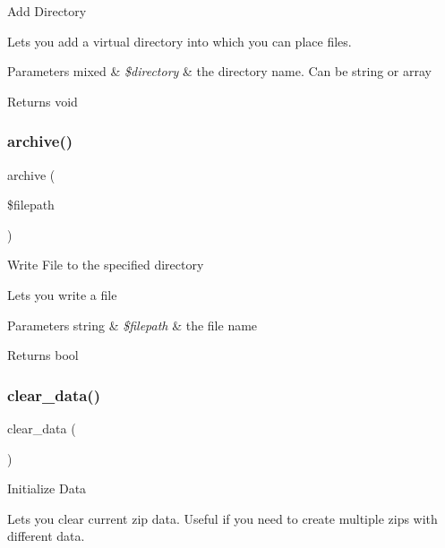 Add Directory

Lets you add a virtual directory into which you can place files.


\begin{DoxyParams}[1]{Parameters}
mixed & {\em \$directory} & the directory name. Can be string or array \\
\hline
\end{DoxyParams}
\begin{DoxyReturn}{Returns}
void 
\end{DoxyReturn}
\mbox{\label{class_c_i___zip_a935879d7074c751a4ac886aebd66cbd4}} 
\subsubsection{\texorpdfstring{archive()}{archive()}}
{\footnotesize\ttfamily archive (\begin{DoxyParamCaption}\item[{}]{\$filepath }\end{DoxyParamCaption})}

Write File to the specified directory

Lets you write a file


\begin{DoxyParams}[1]{Parameters}
string & {\em \$filepath} & the file name \\
\hline
\end{DoxyParams}
\begin{DoxyReturn}{Returns}
bool 
\end{DoxyReturn}
\mbox{\label{class_c_i___zip_a89d046bac0ab06a81c5c03d55b4bcae5}} 
\subsubsection{\texorpdfstring{clear\+\_\+data()}{clear\_data()}}
{\footnotesize\ttfamily clear\+\_\+data (\begin{DoxyParamCaption}{ }\end{DoxyParamCaption})}

Initialize Data

Lets you clear current zip data. Useful if you need to create multiple zips with different data.

